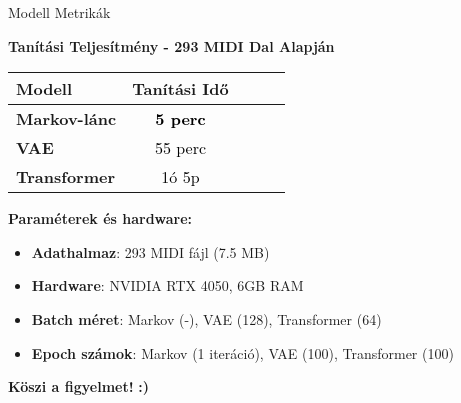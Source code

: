 \documentclass[aspectratio=169]{beamer}
\begin{document}
\begin{frame}{Modell Metrikák}
    \begin{center}
    \textbf{Tanítási Teljesítmény - 293 MIDI Dal Alapján}
    
    \vspace{0.5cm}
    
    \begin{tabular}{|l|c|c|c|c|}
    \hline
    \textbf{Modell} & \textbf{Tanítási Idő} \\
    \hline
    \textbf{Markov-lánc} & \textcolor{black}{\textbf{5 perc}} \\
    \hline
    \textbf{VAE} & \textcolor{black}{55 perc} \\
    \hline
    \textbf{Transformer} & \textcolor{black}{1ó 5p} \\
    \hline
    \end{tabular}
    
    \vspace{0.5cm}
    
    \textbf{Paraméterek és hardware:}
    \begin{itemize}
        \item \textbf{Adathalmaz}: 293 MIDI fájl (7.5 MB)
        \item \textbf{Hardware}: NVIDIA RTX 4050, 6GB RAM
        \item \textbf{Batch méret}: Markov (-), VAE (128), Transformer (64)
        \item \textbf{Epoch számok}: Markov (1 iteráció), VAE (100), Transformer (100)
    \end{itemize}
    
    \vspace{0.3cm}
    
    \begin{center}
    \end{center}
    \end{center}
    \end{frame}

\begin{frame}
\vspace{1cm}
\begin{center}
\textbf{Köszi a figyelmet!}
\textbf{:)}

\end{center}
\end{frame}
\end{document}
